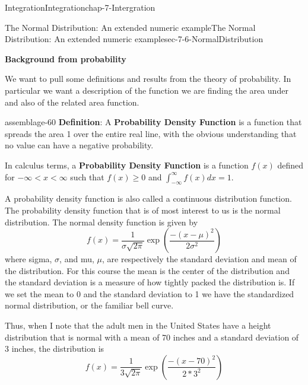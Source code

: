 \documentclass[oneside,10pt,]{book}
\newcommand{\terminology}[1]{\textbf{#1}}
\numberwithin{equation}{section}
\newcommand{\lt}{<}
\begin{document}
\begin{chapterptx}{Integration}{}{Integration}{}{}{chap-7-Intergration}
\begin{sectionptx}{The Normal Distribution: An extended numeric example}{}{The Normal Distribution: An extended numeric example}{}{}{sec-7-6-NormalDistribution}
\par
\hypertarget{p-2928}{}%
\terminology{Background from probability}%
\par
\hypertarget{p-2929}{}%
We want to pull some definitions and results from the theory of probability.  In particular we want a description of the function we are finding the area under and also of the related area function.%
\begin{assemblage}{}{assemblage-60}%
\hypertarget{p-2930}{}%
\terminology{Definition}: A \terminology{Probability Density Function} is a function that spreads the area 1 over the entire real line, with the obvious understanding that no value can have a negative probability.%
\par
\hypertarget{p-2931}{}%
In calculus terms, a \terminology{Probability Density Function} is a function  \(f(x)\) defined for \(-\infty\lt x \lt \infty \)  such that \(f(x)\ge 0\)  and  \(\int_{-\infty}^{\infty}f(x)dx=1\).%
\end{assemblage}
\hypertarget{p-2932}{}%
A probability density function is also called a continuous distribution function.  The probability density function that is of most interest to us is the normal distribution.  The normal density function is given by%
%
\begin{equation*}
f(x)=\frac{1}{\sigma\sqrt{2\pi}}\exp\left(\frac{-(x-\mu)^2}{2\sigma^2}\right)
\end{equation*}
\hypertarget{p-2933}{}%
where sigma, \(\sigma\), and mu, \(\mu\), are respectively the standard deviation and mean of the distribution.  For this course the mean is the center of the distribution and the standard deviation is a measure of how tightly packed the distribution is.  If we set the mean to 0 and the standard deviation to 1 we have the standardized normal distribution, or the familiar bell curve.%
\par
\hypertarget{p-2934}{}%
Thus, when I note that the adult men in the United States have a height distribution that is normal with a mean of 70 inches and a standard deviation of 3 inches, the distribution is%
%
\begin{equation*}
f(x)=\frac{1}{3\sqrt{2\pi}}\exp\left(\frac{-(x-70)^2}{2*3^2}\right)
\end{equation*}
\begin{sidebyside}{1}{0.25}{0.25}{0}%
\begin{sbspanel}{0.5}%

\end{sbspanel}
\end{sidebyside}
\end{sectionptx}
\end{chapterptx}
\end{document}

